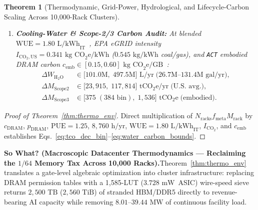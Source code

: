 \documentclass[11pt,letterpaper]{article}
\providecommand{\CoreClbLuts}{1,585}
\providecommand{\AsicTotalPowerMw}{\ensuremath{3.728\text{~mW}}}
\providecommand{\CorePhysicalLUTs}{\CoreClbLuts}
\theoremstyle{spectralthm}
\newtheorem{theorem}{Theorem}[section]
\begin{document}
\begin{theorem}[Thermodynamic, Grid-Power, Hydrological, and Lifecycle-Carbon Scaling Across 10,000-Rack Clusters]
\begin{enumerate}
\begin{equation}
\begin{aligned}
  \Delta P_{\mathrm{grid}} &\in \bigl[8.01\text{~MW}\;(8.04\text{~bin}),\; 39.44\text{~MW}\bigr],\\
  \Delta E_{\mathrm{yr}} &\in \bigl[70.13\;(70.43\text{~bin}),\; 345.49\bigr]\text{~GWh/yr};
  \end{aligned}
  \end{equation}
  \item[(iii)] \textbf{Cooling-Water \& Scope-2/3 Carbon Audit:} At blended $\mathrm{WUE} = 1.80\text{~L/kWh}_{\mathrm{IT}}$~\cite{shehabi2024lbnl, siddik2021water}, EPA eGRID intensity $I_{\mathrm{CO_2,US}} = 0.341\text{~kg CO}_2\text{e/kWh}$ ($0.545\text{~kg/kWh}$ coal/gas), and \texttt{ACT} embodied DRAM carbon $c_{\mathrm{emb}} \in [0.15, 0.60]\text{~kg CO}_2\text{e/GB}$~\cite{gupta2022act}:
  \begin{equation}
  \label{eq:water_carbon_bounds}
  \begin{aligned}
  \Delta W_{\mathrm{H_2O}} &\in \bigl[101.0\text{M},\; 497.5\text{M}\bigr]\text{~L/yr}\;\bigl(26.7\text{M--}131.4\text{M gal/yr}\bigr),\\
  \Delta M_{\mathrm{Scope2}} &\in \bigl[23,915,\; 117,814\bigr]\text{~tCO}_2\text{e/yr}\;\text{(U.S. avg.)},\\
  \Delta M_{\mathrm{Scope3}} &\in \bigl[375\;(384\text{~bin}),\; 1,536\bigr]\text{~tCO}_2\text{e}\;\text{(embodied)}.
  \end{aligned}
  \end{equation}
\end{enumerate}
\end{theorem}
\begin{proof}[Proof of Theorem~\ref{thm:thermo_env}]
Direct multiplication of $N_{\mathrm{racks}} f_{\mathrm{meta}} M_{\mathrm{rack}}$ by $c_{\mathrm{DRAM}}$, $p_{\mathrm{DRAM}}$, $\mathrm{PUE} = 1.25$, $8,760\text{~h/yr}$, $\mathrm{WUE} = 1.80\text{~L/kWh}_{\mathrm{IT}}$, $I_{\mathrm{CO_2}}$, and $c_{\mathrm{emb}}$ establishes Eqs.~\eqref{eq:tco_dec_bin}--\eqref{eq:water_carbon_bounds}.
\end{proof}

\noindent\textbf{So What? (Macroscopic Datacenter Thermodynamics --- Reclaiming the $1/64$ Memory Tax Across 10,000 Racks).}\;Theorem~\ref{thm:thermo_env} translates a gate-level algebraic optimization into cluster infrastructure: replacing DRAM permission tables with a \CorePhysicalLUTs-LUT (\AsicTotalPowerMw\ ASIC) wire-speed sieve returns $2,500\text{~TB}$ ($2,560\text{~TiB}$) of stranded HBM/DDR5 directly to revenue-bearing AI capacity while removing $8.01$--$39.44\text{~MW}$ of continuous facility load.
\end{document}
